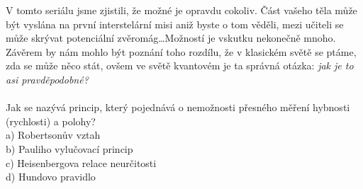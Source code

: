 \documentclass[crop=false]{standalone}
\begin{document}
V tomto seriálu jsme zjistili, že možné je opravdu cokoliv. Část vašeho těla může být vyslána na první interstelární misi aniž byste o tom věděli, mezi učiteli se může skrývat potenciální zvěromág\dots Možností je vskutku nekonečně mnoho. Závěrem by nám mohlo být poznání toho rozdílu, že v klasickém světě se ptáme, zda se může něco stát, ovšem ve světě kvantovém je ta správná otázka: \textit{jak je to asi pravděpodobné?}
\\
\\
Jak se nazývá princip, který pojednává o nemožnosti přesného měření hybnosti (rychlosti) a polohy?
\\

a) Robertsonův vztah
\\

b) Pauliho vylučovací princip
\\

c) Heisenbergova relace neurčitosti
\\

d) Hundovo pravidlo
\end{document}
